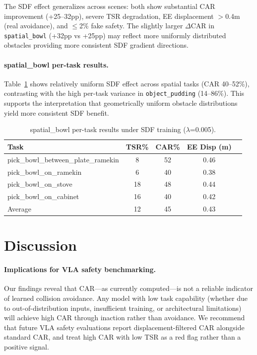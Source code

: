 \documentclass[letterpaper]{article}
\begin{document}
The SDF effect generalizes across scenes: both show substantial CAR improvement (+25--32pp), severe TSR degradation, EE displacement $>$0.4m (real avoidance), and $\leq$2\% fake safety. The slightly larger $\Delta$CAR in \texttt{spatial\_bowl} (+32pp vs +25pp) may reflect more uniformly distributed obstacles providing more consistent SDF gradient directions.

\paragraph{spatial\_bowl per-task results.} Table~\ref{tab:spatial_tasks} shows relatively uniform SDF effect across spatial tasks (CAR 40--52\%), contrasting with the high per-task variance in \texttt{object\_pudding} (14--86\%). This supports the interpretation that geometrically uniform obstacle distributions yield more consistent SDF benefit.

\begin{table}[h]
\centering
\caption{spatial\_bowl per-task results under SDF training ($\lambda$=0.005).}
\label{tab:spatial_tasks}
\begin{tabular}{lcccc}
\toprule
\textbf{Task} & \textbf{TSR\%} & \textbf{CAR\%} & \textbf{EE Disp (m)} \\
\midrule
pick\_bowl\_between\_plate\_ramekin & 8 & 52 & 0.46 \\
pick\_bowl\_on\_ramekin & 6 & 40 & 0.38 \\
pick\_bowl\_on\_stove & 18 & 48 & 0.44 \\
pick\_bowl\_on\_cabinet & 16 & 40 & 0.42 \\
\midrule
Average & 12 & 45 & 0.43 \\
\bottomrule
\end{tabular}
\end{table}

\section{Discussion}
\label{sec:discussion}

\paragraph{Implications for VLA safety benchmarking.}
Our findings reveal that CAR---as currently computed---is not a reliable indicator of learned collision avoidance. Any model with low task capability (whether due to out-of-distribution inputs, insufficient training, or architectural limitations) will achieve high CAR through inaction rather than avoidance. We recommend that future VLA safety evaluations report displacement-filtered CAR alongside standard CAR, and treat high CAR with low TSR as a red flag rather than a positive signal.
\end{document}
